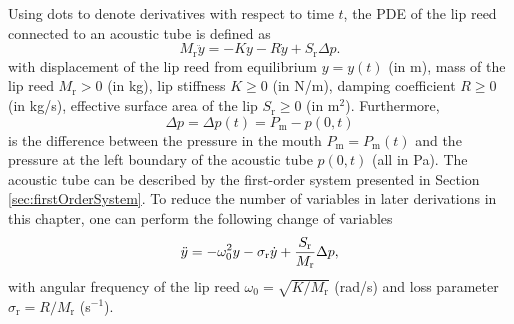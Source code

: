 Using dots to denote derivatives with respect to time $t$, the PDE of the lip reed connected to an acoustic tube is defined as
\begin{equation}
    M_\text{r}\ddot y = -K y - R \dot y + S_\text{r}\Delta p.
\end{equation}
with displacement of the lip reed from equilibrium $y = y(t)$ (in m), mass of the lip reed $M_\text{r} > 0$ (in kg), lip stiffness $K\geq 0$ (in N/m), damping coefficient $R\geq 0$ (in kg/s), effective surface area of the lip $S_\text{r}\geq 0$ (in m$^2$). Furthermore,  
\begin{equation}\label{eq:deltaP}
    \Delta p = \Delta p(t) = P_\text{m} - p(0,t)
\end{equation}
is the difference between the pressure in the mouth $P_\text{m} = P_\text{m}(t)$ and the pressure at the left boundary of the acoustic tube $p(0,t)$ (all in Pa). The acoustic tube can be described by the first-order system presented in Section \ref{sec:firstOrderSystem}.
To reduce the number of variables in later derivations in this chapter, one can perform the following change of variables
\begin{equation}
    \ddot y = -\omega_0^2 y - \sigma_\text{r} \dot y + \frac{S_\text{r}}{M_{\text{r}}}\Delta p,
\end{equation}
with angular frequency of the lip reed $\omega_0 = \sqrt{K/M_\text{r}}$ (rad/s) and loss parameter $\sigma_\text{r} = R / M_\text{r}$ (s$^{-1}$). 
